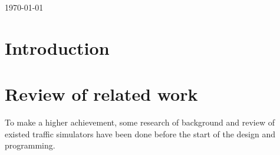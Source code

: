 \documentclass[a4paper,12pt]{article}
\begin{document}
\begin{titlepage}
{\large \today}\\[3cm] %




\vfill %

\end{titlepage}


\tableofcontents

\section{Introduction}

\section{Review of related work}
To make a higher achievement, some research of background and review of existed traffic simulators have been done before the start of the design and programming.\\
\end{document}
